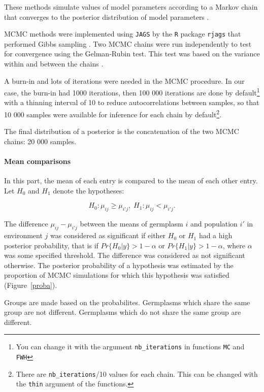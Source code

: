 \documentclass{book}\usepackage[]{graphicx}\usepackage[]{color}
\begin{document}
These methods simulate values of model parameters according to a Markov chain that converges to the posterior distribution of model parameters \citep{robert_bayesian_2001}.

MCMC methods were implemented using \texttt{JAGS} by the \texttt{R} package \texttt{rjags} that performed Gibbs sampling \citep{robert_bayesian_2001}.
Two MCMC chains were run independently to test for convergence using the Gelman-Rubin test.
This test was based on the variance within and between the chains \citep{gelman_inference_1992}.

A burn-in and lots of iterations were needed in the MCMC procedure.
In our case, the burn-in had 1000 iterations, then 100 000 iterations are done by default\footnote{You can change it with the argument \texttt{nb\_iterations} in functions \texttt{MC} and \texttt{FWH}} with a thinning interval of 10 to reduce autocorrelations between samples, so that 10 000 samples were available for inference for each chain by default\footnote{There are \texttt{nb\_iterations}/10 values for each chain. This can be changed with the \texttt{thin} argument of the functions.}.

The final distribution of a posterior is the concatenation of the two MCMC chains: 20 000 samples.


\paragraph{Mean comparisons}
\label{mean_comp}

In this part, the mean of each entry is compared to the mean of each other entry.
Let $H_{0}$ and $H_{1}$ denote the hypotheses:

\begin{displaymath}
  H_{0} : \mu_{ij} \ge \mu_{i'j} , \; H_{1} : \mu_{ij} < \mu_{i'j}.
\end{displaymath}

The difference $\mu_{ij}-\mu_{i'j}$ between the means of germplasm $i$ and population $i'$ in environment $j$ was considered as significant if either $H_{0}$ or $H_{1}$ had a high posterior probability, that is if $Pr\{H_{0}|y\} > 1 - \alpha$ or $Pr\{H_{1}|y\}> 1 - \alpha$, where
$\alpha$ was some specified threshold.
The difference was considered as not significant otherwise.
The posterior probability of a hypothesis was estimated by the proportion of MCMC simulations for
which this hypothesis was satisfied (Figure~\ref{proba}).

Groups are made based on the probabilites.
Germplasms which share the same group are not different.
Germplasms which do not share the same group are different.
\end{document}

